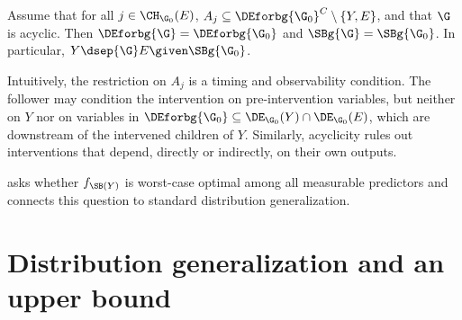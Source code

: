 

\begin{lemma}%
\label{lem:augmentation}
Assume that for all $j \in \CH_{\G_0}(E)$, $A_j \subseteq \DEforbg{\G_0}^C \setminus \{Y, E\}$, and that $\G$ is acyclic. Then $\DEforbg{\G} = \DEforbg{\G_0}$ and $\SBg{\G} = \SBg{\G_0}$. In particular, $Y \dsep{\G} E \given \SBg{\G_0}$.
\end{lemma}

Intuitively, the restriction on $A_j$ is a timing and observability condition. The follower may condition the intervention on pre-intervention variables,
but neither on $Y$ nor on variables in $\DEforbg{\G_0} \subseteq \DE_{\G_0}(Y) \cap \DE_{\G_0}(E)$, which are downstream of the intervened children of $Y$. Similarly, acyclicity rules out interventions that depend, directly or indirectly, on their own outputs.

 asks whether $f_{\SB(Y)}$ is worst-case
optimal among all measurable predictors and connects 
this question to
standard distribution generalization.



\section{Distribution generalization and an upper bound} \label{sec:optimality}

